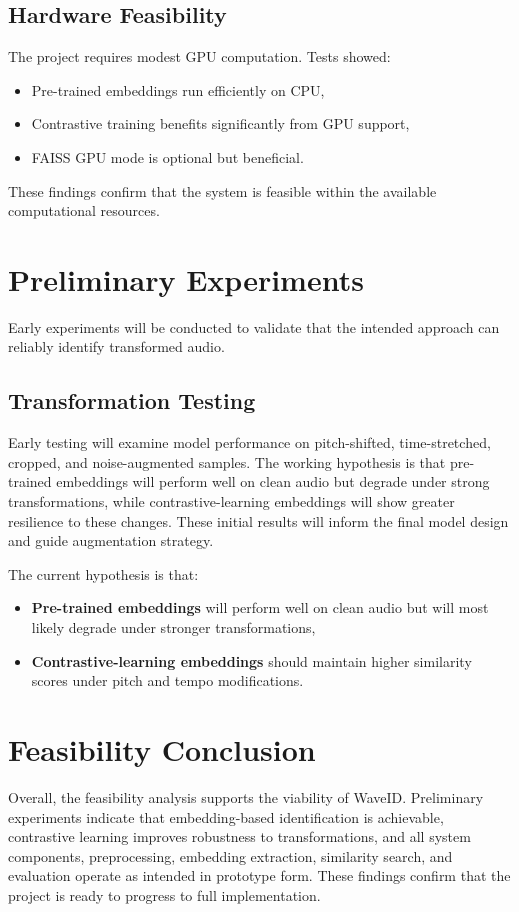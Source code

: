 \documentclass[../Thesis]{subfiles}
\begin{document}
\subsection{Hardware Feasibility}
The project requires modest GPU computation. Tests showed:
\begin{itemize}
    \item Pre-trained embeddings run efficiently on CPU,
    \item Contrastive training benefits significantly from GPU support,
    \item FAISS GPU mode is optional but beneficial.
\end{itemize}

These findings confirm that the system is feasible within the available computational resources.

\section{Preliminary Experiments}
Early experiments will be conducted to validate that the intended approach can reliably identify transformed audio.

\subsection{Transformation Testing}
Early testing will examine model performance on pitch-shifted, time-stretched, cropped, and noise-augmented samples. The working hypothesis is that pre-trained embeddings will perform well on clean audio but degrade under strong transformations, while contrastive-learning embeddings will show greater resilience to these changes. These initial results will inform the final model design and guide augmentation strategy.


The current hypothesis is that:
\begin{itemize}
    \item \textbf{Pre-trained embeddings} will perform well on clean audio but will most likely degrade under stronger transformations,
    \item \textbf{Contrastive-learning embeddings} should maintain higher similarity scores under pitch and tempo modifications.
\end{itemize}

\section{Feasibility Conclusion}
Overall, the feasibility analysis supports the viability of WaveID. Preliminary experiments indicate that embedding-based identification is achievable, contrastive learning improves robustness to transformations, and all system components, preprocessing, embedding extraction, similarity search, and evaluation operate as intended in prototype form. These findings confirm that the project is ready to progress to full implementation.
\end{document}
